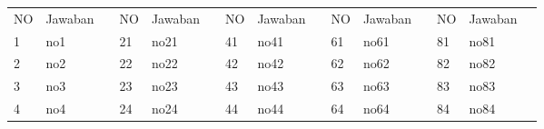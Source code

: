 \documentclass[12pt]{article}
\begin{document}
\begin{table}[]
\centering
\label{my-label}
\begin{tabular}{lllllllllllllll}
\cline{1-2} \cline{4-5} \cline{7-8} \cline{10-11} \cline{13-14}


\multicolumn{1}{|l|}{NO} & 
\multicolumn{1}{l|}{Jawaban} & 
\multicolumn{1}{l|}{} & 
\multicolumn{1}{l|}{NO} & 
\multicolumn{1}{l|}{Jawaban} & 
\multicolumn{1}{l|}{} & 
\multicolumn{1}{l|}{NO} & 
\multicolumn{1}{l|}{Jawaban} & 
\multicolumn{1}{l|}{} & 
\multicolumn{1}{l|}{NO} & 
\multicolumn{1}{l|}{Jawaban} & 
\multicolumn{1}{l|}{} & 
\multicolumn{1}{l|}{NO}  & 
\multicolumn{1}{l|}{Jawaban} &  \\ \cline{1-2} \cline{4-5} \cline{7-8} \cline{10-11} \cline{13-14}


\multicolumn{1}{|l|}{1}  & 
\multicolumn{1}{l|}{no1}        & 
\multicolumn{1}{l|}{} & 
\multicolumn{1}{l|}{21} & 
\multicolumn{1}{l|}{no21}        & 
\multicolumn{1}{l|}{} & 
\multicolumn{1}{l|}{41} & 
\multicolumn{1}{l|}{no41}        & 
\multicolumn{1}{l|}{} & 
\multicolumn{1}{l|}{61} & 
\multicolumn{1}{l|}{no61}        & 
\multicolumn{1}{l|}{} & 
\multicolumn{1}{l|}{81}  & 
\multicolumn{1}{l|}{no81}        &  \\ \cline{1-2} \cline{4-5} \cline{7-8} \cline{10-11} \cline{13-14}


\multicolumn{1}{|l|}{2}  & 
\multicolumn{1}{l|}{no2}        & 
\multicolumn{1}{l|}{} & 
\multicolumn{1}{l|}{22} & 
\multicolumn{1}{l|}{no22}        & 
\multicolumn{1}{l|}{} & 
\multicolumn{1}{l|}{42} & 
\multicolumn{1}{l|}{no42}        & 
\multicolumn{1}{l|}{} & 
\multicolumn{1}{l|}{62} & 
\multicolumn{1}{l|}{no62}        & 
\multicolumn{1}{l|}{} & 
\multicolumn{1}{l|}{82}  & 
\multicolumn{1}{l|}{no82}        &  \\ \cline{1-2} \cline{4-5} \cline{7-8} \cline{10-11} \cline{13-14}


\multicolumn{1}{|l|}{3}  & 
\multicolumn{1}{l|}{no3}        & 
\multicolumn{1}{l|}{} & 
\multicolumn{1}{l|}{23} & 
\multicolumn{1}{l|}{no23}        & 
\multicolumn{1}{l|}{} & 
\multicolumn{1}{l|}{43} & 
\multicolumn{1}{l|}{no43}        & 
\multicolumn{1}{l|}{} & 
\multicolumn{1}{l|}{63} & 
\multicolumn{1}{l|}{no63}        & 
\multicolumn{1}{l|}{} & 
\multicolumn{1}{l|}{83}  & 
\multicolumn{1}{l|}{no83}        &  \\ \cline{1-2} \cline{4-5} \cline{7-8} \cline{10-11} \cline{13-14}


\multicolumn{1}{|l|}{4}  & 
\multicolumn{1}{l|}{no4}        & 
\multicolumn{1}{l|}{} & 
\multicolumn{1}{l|}{24} & 
\multicolumn{1}{l|}{no24}        & 
\multicolumn{1}{l|}{} & 
\multicolumn{1}{l|}{44} & 
\multicolumn{1}{l|}{no44}        & 
\multicolumn{1}{l|}{} & 
\multicolumn{1}{l|}{64} & 
\multicolumn{1}{l|}{no64}        & 
\multicolumn{1}{l|}{} & 
\multicolumn{1}{l|}{84}  & 
\multicolumn{1}{l|}{no84}        &  \\ \cline{1-2} \cline{4-5} \cline{7-8} \cline{10-11} \cline{13-14}



\end{tabular}
\end{table}
\end{document}
